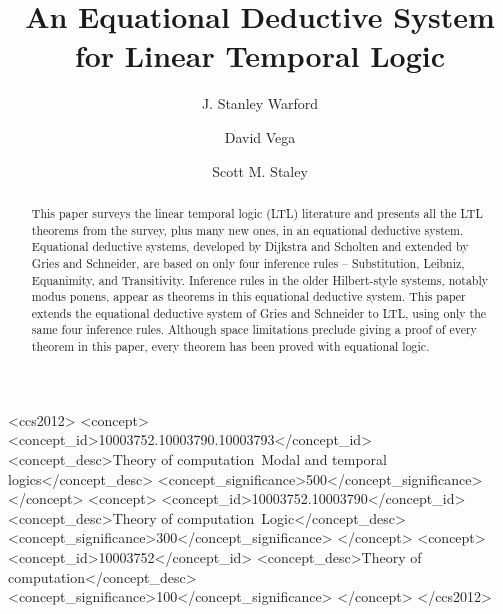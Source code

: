 \documentclass[format=acmsmall, review=false, screen=true, fleqn]{acmart}
\begin{document}
\title{An Equational Deductive System for Linear Temporal Logic}

\author{J. Stanley Warford}
\author{David Vega}
\author{Scott M. Staley}

\begin{abstract}
This paper surveys the linear temporal logic (LTL) literature and presents all the LTL theorems from the survey, plus many new ones, in an equational deductive system.
Equational deductive systems, developed by Dijkstra and Scholten and extended by Gries and Schneider, are based on only four inference rules -- Substitution, Leibniz, Equanimity, and Transitivity.
Inference rules in the older Hilbert-style systems, notably modus ponens, appear as theorems in this equational deductive system.
This paper extends the equational deductive system of Gries and Schneider to LTL, using only the same four inference rules.
Although space limitations preclude giving a proof of every theorem in this paper, every theorem has been proved with equational logic.\end{abstract}

%
%
\begin{CCSXML}
<ccs2012>
<concept>
<concept_id>10003752.10003790.10003793</concept_id>
<concept_desc>Theory of computation~Modal and temporal logics</concept_desc>
<concept_significance>500</concept_significance>
</concept>
<concept>
<concept_id>10003752.10003790</concept_id>
<concept_desc>Theory of computation~Logic</concept_desc>
<concept_significance>300</concept_significance>
</concept>
<concept>
<concept_id>10003752</concept_id>
<concept_desc>Theory of computation</concept_desc>
<concept_significance>100</concept_significance>
</concept>
</ccs2012>
\end{CCSXML}

%
%


\maketitle


\end{document}
